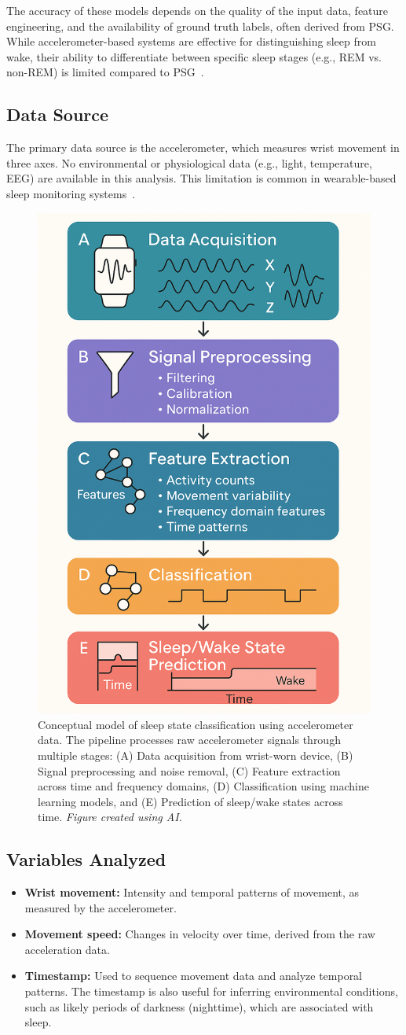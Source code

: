 \documentclass[conference]{IEEEtran}
\begin{document}
The accuracy of these models depends on the quality of the input data, feature engineering, and the availability of ground truth labels, often derived from PSG. While accelerometer-based systems are effective for distinguishing sleep from wake, their ability to differentiate between specific sleep stages (e.g., REM vs. non-REM) is limited compared to PSG~\cite{pmc4883440, researchgate2021, kushida2001, griessenberger2013}.

\subsection{Data Source}
The primary data source is the accelerometer, which measures wrist movement in three axes. No environmental or physiological data (e.g., light, temperature, EEG) are available in this analysis. This limitation is common in wearable-based sleep monitoring systems~\cite{researchgate2021}.

\begin{figure}[h]
	\centering
	\includegraphics[width=0.3\linewidth]{figures/conceptual_model.png}
	\caption{Conceptual model of sleep state classification using accelerometer data. The pipeline processes raw accelerometer signals through multiple stages: (A) Data acquisition from wrist-worn device, (B) Signal preprocessing and noise removal, (C) Feature extraction across time and frequency domains, (D) Classification using machine learning models, and (E) Prediction of sleep/wake states across time. \textit{Figure created using AI.}}
	\label{fig:conceptual_model}
\end{figure}

\subsection{Variables Analyzed}
\begin{itemize}
	\item \textbf{Wrist movement:} Intensity and temporal patterns of movement, as measured by the accelerometer.
	\item \textbf{Movement speed:} Changes in velocity over time, derived from the raw acceleration data.
	\item \textbf{Timestamp:} Used to sequence movement data and analyze temporal patterns. The timestamp is also useful for inferring environmental conditions, such as likely periods of darkness (nighttime), which are associated with sleep.
\end{itemize}
\end{document}
